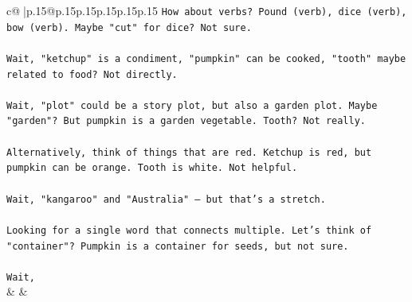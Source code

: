 \documentclass{article}
\begin{document}
{\begin{supertabular}{c@{$\;$}|p{.15\linewidth}@{}p{.15\linewidth}p{.15\linewidth}p{.15\linewidth}p{.15\linewidth}p{.15\linewidth}}
{{{\texttt{How about verbs? Pound (verb), dice (verb), bow (verb). Maybe "cut" for dice? Not sure. } \\
\\ 
\texttt{Wait, "ketchup" is a condiment, "pumpkin" can be cooked, "tooth" maybe related to food? Not directly. } \\
\\ 
\texttt{Wait, "plot" could be a story plot, but also a garden plot. Maybe "garden"? But pumpkin is a garden vegetable. Tooth? Not really. } \\
\\ 
\texttt{Alternatively, think of things that are red. Ketchup is red, but pumpkin can be orange. Tooth is white. Not helpful. } \\
\\ 
\texttt{Wait, "kangaroo" and "Australia" – but that's a stretch. } \\
\\ 
\texttt{Looking for a single word that connects multiple. Let's think of "container"? Pumpkin is a container for seeds, but not sure. } \\
\\ 
\texttt{Wait,} \\
            }
        }
    }
    & & \\ \\


\end{supertabular}}
\end{document}
